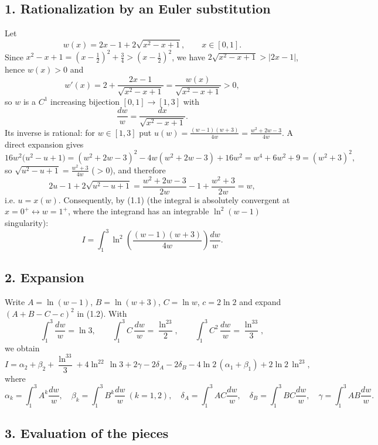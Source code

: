 \documentclass[11pt]{article}
\theoremstyle{remark}
\begin{document}
\subsection*{1. Rationalization by an Euler substitution}

Let
\[
w(x)=2x-1+2\sqrt{x^2-x+1},\qquad x\in[0,1].
\]
Since $x^2-x+1=(x-\frac12)^2+\frac34>(x-\frac12)^2$, we have $2\sqrt{x^2-x+1}>|2x-1|$, hence $w(x)>0$ and
\[
w'(x)=2+\frac{2x-1}{\sqrt{x^2-x+1}}=\frac{w(x)}{\sqrt{x^2-x+1}}>0 ,
\]
so $w$ is a $C^1$ increasing bijection $[0,1]\to[1,3]$ with
\begin{equation*}
\frac{dw}{w}=\frac{dx}{\sqrt{x^2-x+1}}. \tag{1.1}
\end{equation*}
Its inverse is rational: for $w\in[1,3]$ put $u(w)=\frac{(w-1)(w+3)}{4w}=\frac{w^2+2w-3}{4w}$. A direct expansion gives
\[
16w^2\big(u^2-u+1\big)=(w^2+2w-3)^2-4w(w^2+2w-3)+16w^2=w^4+6w^2+9=(w^2+3)^2,
\]
so $\sqrt{u^2-u+1}=\frac{w^2+3}{4w}$ ($>0$), and therefore
\[
2u-1+2\sqrt{u^2-u+1}=\frac{w^2+2w-3}{2w}-1+\frac{w^2+3}{2w}=w,
\]
i.e. $u=x(w)$. Consequently, by (1.1) (the integral is absolutely convergent at $x=0^+\leftrightarrow w=1^+$, where the integrand has an integrable $\ln^2(w-1)$ singularity):
\begin{equation*}
I=\int_1^3\ln^2\!\left(\frac{(w-1)(w+3)}{4w}\right)\frac{dw}{w}. \tag{1.2}
\end{equation*}

\subsection*{2. Expansion}

Write $A=\ln(w-1)$, $B=\ln(w+3)$, $C=\ln w$, $c=2\ln2$ and expand $(A+B-C-c)^2$ in (1.2). With
\[
\int_1^3\frac{dw}{w}=\ln3,\qquad\int_1^3 C\,\frac{dw}{w}=\frac{\ln^23}{2},\qquad\int_1^3C^2\,\frac{dw}{w}=\frac{\ln^33}{3},
\]
we obtain
\begin{equation*}
I=\alpha_2+\beta_2+\frac{\ln^33}{3}+4\ln^22\,\ln3+2\gamma-2\delta_A-2\delta_B-4\ln2\,(\alpha_1+\beta_1)+2\ln2\,\ln^23, \tag{2.1}
\end{equation*}
where
\[
\alpha_k=\int_1^3 A^k\frac{dw}{w},\quad \beta_k=\int_1^3B^k\frac{dw}{w}\ (k=1,2),\quad
\delta_A=\int_1^3 AC\frac{dw}{w},\quad \delta_B=\int_1^3BC\frac{dw}{w},\quad \gamma=\int_1^3AB\frac{dw}{w}.
\]

\subsection*{3. Evaluation of the pieces}
\end{document}
